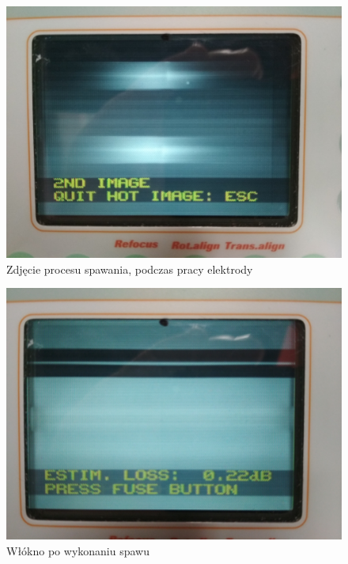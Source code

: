 \documentclass[12pt, a4paper, oneside]{article}
\begin{document}
\begin{figure}[t]
\centering
\caption{Zdjęcie procesu spawania, podczas pracy elektrody}
\includegraphics[scale=0.075]{f3.jpg}
\end{figure}
\begin{figure}[b]
\centering
\caption{Włókno po wykonaniu spawu}
\includegraphics[scale=0.075]{f4.jpg}
\end{figure}
\clearpage
\end{document}
